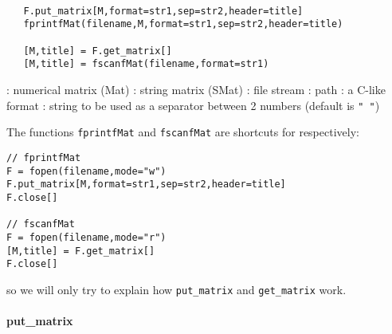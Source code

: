 

\begin{mandesc}
  \\
  \\
  \\
\end{mandesc}
\label{put-matrix}
\label{get-matrix}
\begin{calling_sequence}
\begin{verbatim}
   F.put_matrix[M,format=str1,sep=str2,header=title]
   fprintfMat(filename,M,format=str1,sep=str2,header=title)

   [M,title] = F.get_matrix[]
   [M,title] = fscanfMat(filename,format=str1)
\end{verbatim}
\end{calling_sequence}

\begin{parameters}
  \begin{varlist}
    : numerical matrix (Mat)
    : string matrix (SMat)
    : file stream
    : path
    : a C-like format
    : string to be used as a separator between 2 numbers (default is \verb+" "+)
  \end{varlist}
\end{parameters}

\begin{mandescription}
 The functions \verb+fprintfMat+ and \verb+fscanfMat+ are shortcuts for respectively:
\begin{Verbatim}
// fprintfMat
F = fopen(filename,mode="w")
F.put_matrix[M,format=str1,sep=str2,header=title]
F.close[]

// fscanfMat
F = fopen(filename,mode="r")
[M,title] = F.get_matrix[]
F.close[]
\end{Verbatim}
so we will only try to explain how \verb+put_matrix+ and \verb+get_matrix+ work.
\end{mandescription}

\paragraph{put\_matrix}

